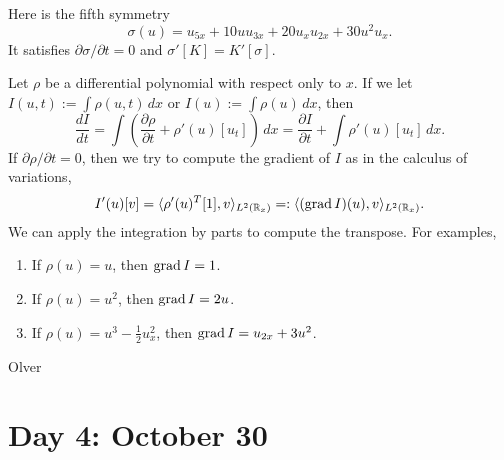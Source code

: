 \documentclass{../../../small}
\begin{document}
Here is the fifth symmetry
\[\sigma(u)=u_{5x}+10uu_{3x}+20u_xu_{2x}+30u^2u_x.\]
It satisfies $\partial\sigma/\partial t=0$ and $\sigma'[K]=K'[\sigma]$.


\bigskip
Let $\rho$ be a differential polynomial with respect only to $x$.
If we let $I(u,t):=\int\rho(u,t)\,dx$ or $I(u):=\int\rho(u)\,dx$, then
\[\frac{dI}{dt}=\int(\frac{\partial\rho}{\partial t}+\rho'(u)[u_t])\,dx=\frac{\partial I}{\partial t}+\int\rho'(u)[u_t]\,dx.\]
If $\partial\rho/\partial t=0$, then we try to compute the gradient of $I$ as in the calculus of variations,
\[I'(u)[v]=\langle\rho'(u)^T[1],v\rangle_{L^2(\mathbb{R}_x)}=:\langle(\operatorname{grad} I)(u),v\rangle_{L^2(\mathbb{R}_x)}.\]
We can apply the integration by parts to compute the transpose.
For examples,
\begin{enumerate}
\item If $\rho(u)=u$, then $\operatorname{grad} I=1$.
\item If $\rho(u)=u^2$, then $\operatorname{grad} I=2u$.
\item If $\rho(u)=u^3-\frac12u_x^2$, then $\operatorname{grad} I=u_{2x}+3u^2$.
\end{enumerate}

Olver



\newpage
\section{Day 4: October 30}
\end{document}
